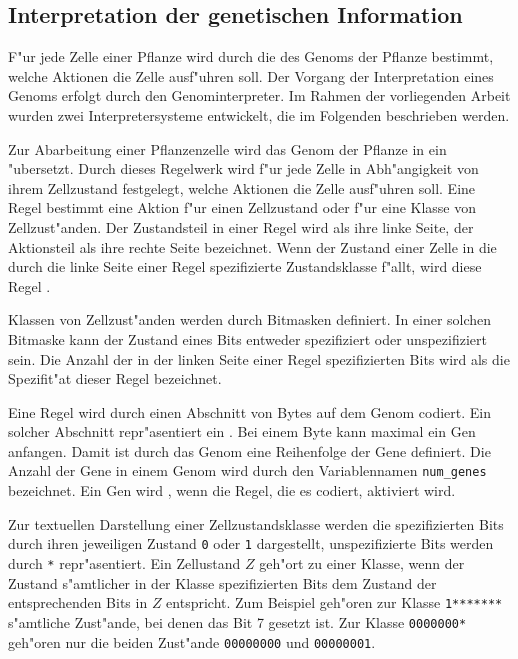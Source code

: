 \subsection{Interpretation der genetischen Information}
\label{interpreterdef}

F"ur jede Zelle einer Pflanze wird durch die  des
Genoms der Pflanze bestimmt, welche Aktionen die Zelle ausf"uhren
soll. Der Vorgang der Interpretation eines Genoms erfolgt durch den
Genominterpreter. Im Rahmen der vorliegenden Arbeit wurden zwei
Interpretersysteme entwickelt, die im Folgenden beschrieben werden.

Zur Abarbeitung einer Pflanzenzelle wird das Genom der Pflanze in ein 
"ubersetzt. Durch dieses Regelwerk wird f"ur jede Zelle in Abh"angigkeit
von ihrem Zellzustand festgelegt, welche Aktionen die Zelle ausf"uhren
soll. Eine Regel bestimmt eine Aktion f"ur einen Zellzustand oder f"ur eine Klasse
von Zellzust"anden. Der Zustandsteil in einer Regel wird als ihre linke Seite, der
Aktionsteil als ihre rechte Seite bezeichnet.
Wenn der Zustand einer Zelle in die durch die linke Seite einer Regel
spezifizierte Zustandsklasse f"allt, wird diese Regel .

Klassen von Zellzust"anden werden durch Bitmasken definiert. In einer
solchen Bitmaske kann der Zustand eines Bits entweder spezifiziert oder
unspezifiziert sein. Die Anzahl der in der linken Seite einer Regel
spezifizierten Bits wird als die Spezifit"at dieser Regel bezeichnet.

Eine Regel wird durch einen Abschnitt von Bytes auf dem Genom codiert.
Ein solcher Abschnitt repr"asentiert ein . Bei einem Byte kann maximal
ein Gen anfangen. Damit ist durch das Genom eine Reihenfolge der Gene
definiert. Die Anzahl der Gene in einem Genom wird durch den
Variablennamen \verb|num_genes| bezeichnet. Ein Gen wird ,
wenn die Regel, die es codiert, aktiviert wird.

Zur textuellen Darstellung einer Zellzustandsklasse werden die spezifizierten
Bits durch ihren jeweiligen Zustand \verb|0| oder \verb|1| dargestellt,
unspezifizierte Bits werden durch \verb|*| repr"asentiert.
Ein Zellustand $Z$ geh"ort zu einer Klasse, wenn der Zustand
s"amtlicher in der Klasse spezifizierten Bits dem Zustand der entsprechenden
Bits in $Z$ entspricht. Zum Beispiel geh"oren zur Klasse
\verb|1*******| s"amtliche Zust"ande, bei denen das Bit 7 gesetzt
ist. Zur Klasse \verb|0000000*| geh"oren nur die beiden Zust"ande
\verb|00000000| und \verb|00000001|.

